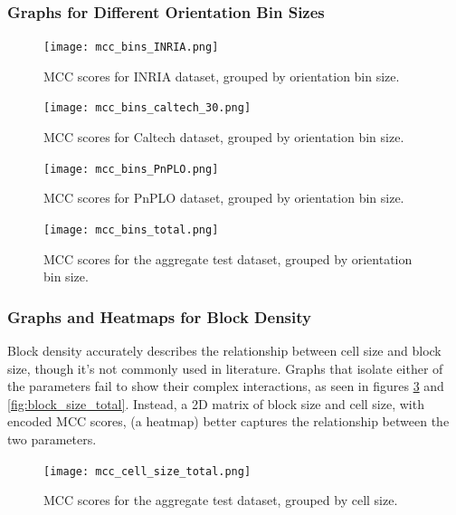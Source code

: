 \subsubsection{Graphs for Different Orientation Bin Sizes}

\begin{figure}
    \centering
    \texttt{[image: mcc\_bins\_INRIA.png]}
    \caption{
        MCC scores for INRIA dataset, grouped by orientation bin size.
    }
    \label{fig:orientation_bins_inria}
\end{figure}

\begin{figure}
    \centering
    \texttt{[image: mcc\_bins\_caltech\_30.png]}
    \caption{
        MCC scores for Caltech dataset, grouped by orientation bin size.
    }
\end{figure}

\begin{figure}
    \centering
    \texttt{[image: mcc\_bins\_PnPLO.png]}
    \caption{
        MCC scores for PnPLO dataset, grouped by orientation bin size.
    }
\end{figure}

\begin{figure}
    \centering
    \texttt{[image: mcc\_bins\_total.png]}
    \caption{
        MCC scores for the aggregate test dataset, grouped by orientation bin size.
    }
    \label{fig:orientation_bins_total}
\end{figure}


\subsubsection{Graphs and Heatmaps for Block Density}

Block density accurately describes the relationship between cell size and block size, though it's not commonly used in literature. Graphs that isolate either of the parameters fail to show their complex interactions, as seen in figures \ref{fig:cell_size_total} and \ref{fig:block_size_total}. Instead, a 2D matrix of block size and cell size, with encoded MCC scores, (a heatmap) better captures the relationship between the two parameters.

\begin{figure}
    \centering
    \texttt{[image: mcc\_cell\_size\_total.png]}
    \caption{
        MCC scores for the aggregate test dataset, grouped by cell size.
    }
    \label{fig:cell_size_total}
\end{figure}

